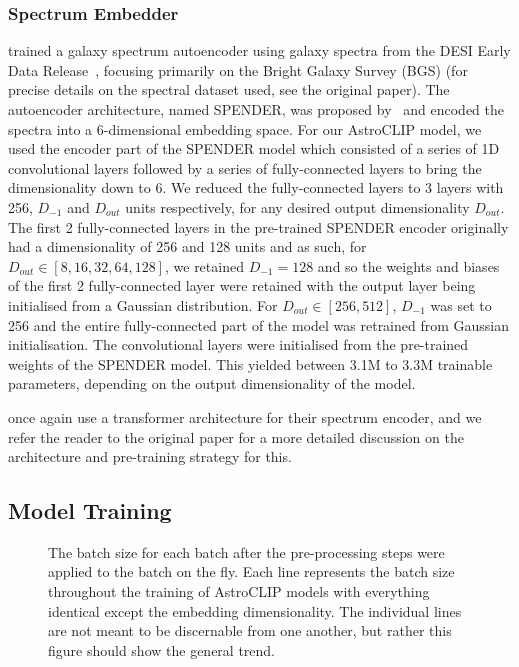 \subsubsection{Spectrum Embedder}\label{subsubsec:spectrum-embedder}
\cite{liang2023} trained a galaxy spectrum autoencoder using galaxy spectra from the DESI Early Data Release~\citep{desiearly2023},
focusing primarily on the Bright Galaxy Survey (BGS) (for precise details on the spectral dataset used, see the original paper).
The autoencoder architecture, named SPENDER, was proposed by~\cite{melchior2022} and encoded the spectra into a 6-dimensional
embedding space.
For our AstroCLIP model, we used the encoder part of the SPENDER model which consisted of a series of 1D convolutional layers
followed by a series of fully-connected layers to bring the dimensionality down to 6.
We reduced the fully-connected layers to 3 layers with 256, $D_{-1}$ and $D_{out}$ units respectively, for any desired
output dimensionality $D_{out}$.
The first 2 fully-connected layers in the pre-trained SPENDER encoder originally had a dimensionality of 256 and 128 units
and as such, for $D_{out} \in [8, 16, 32, 64, 128]$, we retained $D_{-1}=128$ and so the weights and biases of the
first 2 fully-connected layer were retained with the output layer being initialised from a Gaussian distribution.
For $D_{out} \in [256, 512]$, $D_{-1}$ was set to 256 and the entire fully-connected part of the model was retrained
from Gaussian initialisation.
The convolutional layers were initialised from the pre-trained weights of the SPENDER model.
This yielded between 3.1M to 3.3M trainable parameters, depending on the output dimensionality of the model.

\cite{astroclip} once again use a transformer architecture for their spectrum encoder, and we refer the reader to the original
paper for a more detailed discussion on the architecture and pre-training strategy for this.

\subsection{Model Training}\label{subsec:training}
\begin{figure}[t]
    \centering
    \caption{The batch size for each batch after the pre-processing steps were applied to the batch on the fly.
    Each line represents the batch size throughout the training of AstroCLIP models with everything identical except the
    embedding dimensionality.
    The individual lines are not meant to be discernable from one another, but rather this figure should show the general trend.}
    \label{fig:train_batch_size}
\end{figure}

